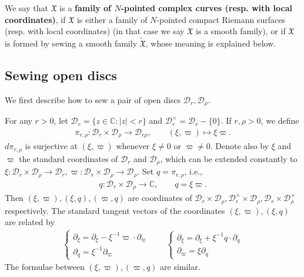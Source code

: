 \documentclass[11pt,b5paper,notitlepage]{article}
\theoremstyle{definition}
\theoremstyle{plain}
\newcommand{\fk}{\mathfrak}
\newcommand{\mc}{\mathcal}
\newcommand{\wtd}{\widetilde}
\newcommand{\mbb}{\mathbb}
\newcommand{\Cbb}{\mathbb C}
\numberwithin{equation}{section}
\begin{document}
We say that $\fk X$ is a \textbf{family of $N$-pointed complex curves (resp. with local coordinates)}, if $\fk X$ is either a family of $N$-pointed compact Riemann surfaces (resp. with local coordinates) (in that case we say $\fk X$ is a smooth family), or if $\fk X$ is formed by sewing a smooth family $\wtd{\fk X}$, whose meaning is  explained below. 

 


\subsection*{Sewing open discs}

We first describe how to sew a pair of open discs $\mc D_r,\mc D_\rho$. 

For any $r>0$, let  $\mc D_r=\{z\in\mbb C:|z|<r \}$ and $\mc D_r^\times=\mc D_r-\{0\}$.\index{Dr@$\mc D_r,\mc D_r^\times$} If $r,\rho>0$, we define \index{zz@$\pi_{r,\rho}:\mc D_r\times\mc D_\rho\rightarrow\mc D_{r\rho}$}
\begin{align}
\pi_{r,\rho}:\mc D_r\times\mc D_\rho\rightarrow\mc D_{r\rho},\qquad (\xi,\varpi)\mapsto \xi\varpi.
\end{align}
$d\pi_{r,\rho}$ is surjective at $(\xi,\varpi)$ whenever $\xi\neq 0$ or $\varpi\neq 0$. Denote also by $\xi$ and $\varpi$ the standard coordinates of $\mc D_r$ and $\mc D_\rho$, which can be extended constantly to $\xi:\mc D_r\times\mc D_\rho\rightarrow\mc D_r,\varpi:\mc D_r\times\mc D_\rho\rightarrow\mc D_\rho$. Set $q=\pi_{r,\rho}$, i.e.,
\begin{align*}
q:\mc D_r\times\mc D_\rho\rightarrow\Cbb,\qquad q=\xi\varpi.
\end{align*}
Then $(\xi,\varpi),(\xi,q),(\varpi,q)$ are coordinates  of $\mc D_r\times \mc D_\rho,\mc D_r^\times\times \mc D_\rho,\mc D_r\times \mc D_\rho^\times$ respectively. The standard tangent vectors of the coordinates $(\xi,\varpi),(\xi,q)$ are related by
\begin{gather}
\left\{ \begin{array}{l}
\partial_\xi=\partial_\xi-\xi^{-1}\varpi\cdot\partial_\varpi\\
\partial_q=\xi^{-1}\partial_\varpi
\end{array} \right.
\qquad
\left\{ \begin{array}{l}
\partial_\xi=\partial_\xi+\xi^{-1}q\cdot\partial_q\\
\partial_\varpi=\xi\partial_q
\end{array} \right.\label{eq23}
\end{gather}
The formulae between $(\xi,\varpi),(\varpi,q)$ are similar.
\end{document}
